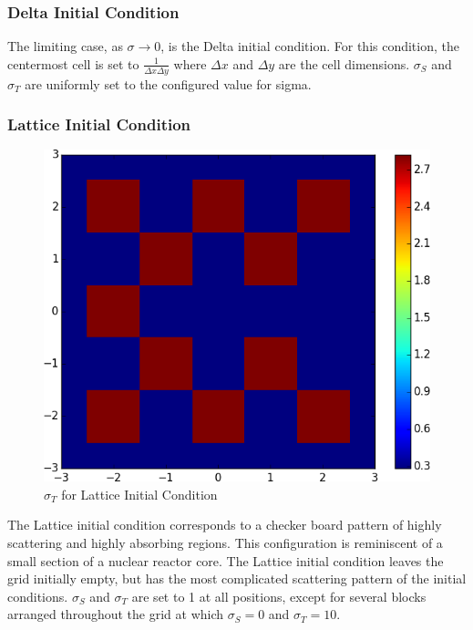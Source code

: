 \documentclass{article}
\begin{document}
\subsubsection{Delta Initial Condition}
The limiting case, as $\sigma \to 0$, is the
Delta initial condition. For this condition, the centermost cell is set to
$\frac{1}{\Delta x \Delta y}$ where $\Delta x$ and $\Delta y$ are the cell
dimensions. $\sigma_S$ and $\sigma_T$ are uniformly set to the configured
value for sigma.

\subsubsection{Lattice Initial Condition}
\begin{figure}
    \centering
    \includegraphics[height=0.3\textheight]{initcond_lattice-t.png}
    \caption{$\sigma_T$ for Lattice Initial Condition}
    \label{fig:lattice_ic}
\end{figure}
The Lattice initial condition corresponds to a checker board pattern
of highly scattering and highly absorbing regions. This configuration is reminiscent of a
small section of a nuclear reactor core. The Lattice initial condition leaves the
grid initially empty, but has the most complicated scattering pattern of the initial
conditions. $\sigma_S$ and $\sigma_T$ are set to 1 at all positions, except
for several blocks arranged throughout the grid at which $\sigma_S=0$ and
$\sigma_T=10$.
\end{document}
